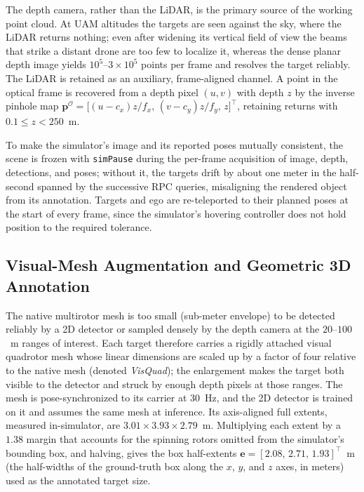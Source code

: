 The depth camera, rather than the LiDAR, is the primary source of the working
point cloud. At UAM altitudes the targets are seen against the sky, where the
LiDAR returns nothing; even after widening its vertical field of view the beams
that strike a distant drone are too few to localize it, whereas the dense planar
depth image yields $10^5$--$3\times10^5$ points per frame and resolves the target
reliably. The LiDAR is retained as an auxiliary, frame-aligned channel. A point
in the optical frame is recovered from a depth pixel $(u,v)$ with depth $z$ by the
inverse pinhole map $\bm{p}^{\mathcal{O}}=\big[(u-c_x)z/f_x,\,(v-c_y)z/f_y,\,z\big]^\top$,
retaining returns with $0.1\le z<250$~m.

To make the simulator's image and its reported poses mutually consistent, the
scene is frozen with \texttt{simPause} during the per-frame acquisition of image,
depth, detections, and poses; without it, the targets drift by about one meter in
the half-second spanned by the successive RPC queries, misaligning the rendered
object from its annotation. Targets and ego are re-teleported to their planned
poses at the start of every frame, since the simulator's hovering controller does
not hold position to the required tolerance.

\subsection{Visual-Mesh Augmentation and Geometric 3D Annotation}
\label{sec:visquad}

The native multirotor mesh is too small (sub-meter envelope) to be detected
reliably by a 2D detector or sampled densely by the depth camera at the
$20$--$100$~m ranges of interest. Each target therefore carries a rigidly
attached visual quadrotor mesh whose linear dimensions are scaled up by a factor
of four relative to the native mesh (denoted \emph{VisQuad}); the enlargement
makes the target both visible to the detector and struck by enough depth pixels
at those ranges. The mesh is pose-synchronized to its carrier at $30$~Hz, and the
2D detector is trained on it and assumes the same mesh at inference. Its
axis-aligned full extents, measured in-simulator, are
$3.01\times3.93\times2.79$~m. Multiplying each extent by a $1.38$ margin that
accounts for the spinning rotors omitted from the simulator's bounding box, and
halving, gives the box half-extents $\bm{e}=[2.08,\,2.71,\,1.93]^\top$~m (the
half-widths of the ground-truth box along the $x$, $y$, and $z$ axes, in meters)
used as the annotated target size.

